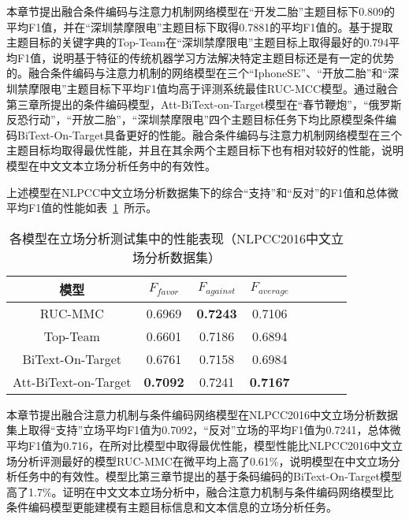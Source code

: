 本章节提出融合条件编码与注意力机制网络模型在“开发二胎”主题目标下0.809的平均F1值，并在“深圳禁摩限电”主题目标下取得0.7881的平均F1值的。基于提取主题目标的关键字典的Top-Team在“深圳禁摩限电”主题目标上取得最好的0.794平均F1值，说明基于特征的传统机器学习方法解决特定主题目标还是有一定的优势的。融合条件编码与注意力机制的网络模型在三个“IphoneSE”、“开放二胎”和“深圳禁摩限电”主题目标下平均F1值均高于评测系统最佳RUC-MCC模型。通过融合第三章所提出的条件编码模型，Att-BiText-on-Target模型在“春节鞭炮”，“俄罗斯反恐行动”，“开放二胎”，“深圳禁摩限电”四个主题目标任务下均比原模型条件编码BiText-On-Target具备更好的性能。融合条件编码与注意力机制网络模型在三个主题目标均取得最优性能，并且在其余两个主题目标下也有相对较好的性能，说明模型在中文文本立场分析任务中的有效性。

上述模型在NLPCC中文立场分析数据集下的综合“支持”和“反对”的F1值和总体微平均F1值的性能如表~\ref{nlpcc_res_attention}~所示。
\begin{table}[htbp]
	\caption[table123]{各模型在立场分析测试集中的性能表现（NLPCC2016中文立场分析数据集）}
	\label{nlpcc_res_attention}
	\vspace{0.5em}\centering\wuhao
	\begin{tabular}{cccccccc}
		\toprule[1.5pt]
		模型& $F_{favor}$&$F_{against}$&$F_{average}$ \\
		\midrule[1pt]
		RUC-MMC\citeup{xu2016overview}&0.6969&\textbf{0.7243}&0.7106\\
		Top-Team\citeup{xu2016overview}&0.6601&0.7186&0.6894\\
		BiText-On-Target&0.6761&0.7158&0.6984\\
	Att-BiText-on-Target&\textbf{0.7092}&0.7241&\textbf{0.7167}\\
		\bottomrule[1.5pt]
	\end{tabular}
\end{table}

本章节提出融合注意力机制与条件编码网络模型在NLPCC2016中文立场分析数据集上取得“支持”立场平均F1值为0.7092，“反对”立场的平均F1值为0.7241，总体微平均F1值为0.716，在所对比模型中取得最优性能，模型性能比NLPCC2016中文立场分析评测最好的模型RUC-MMC在微平均上高了0.61\%，说明模型在中文立场分析任务中的有效性。模型比第三章节提出的基于条码编码的BiText-On-Target模型高了1.7\%。证明在中文文本立场分析中，融合注意力机制与条件编码网络模型比条件编码模型更能建模有主题目标信息和文本信息的立场分析任务。

